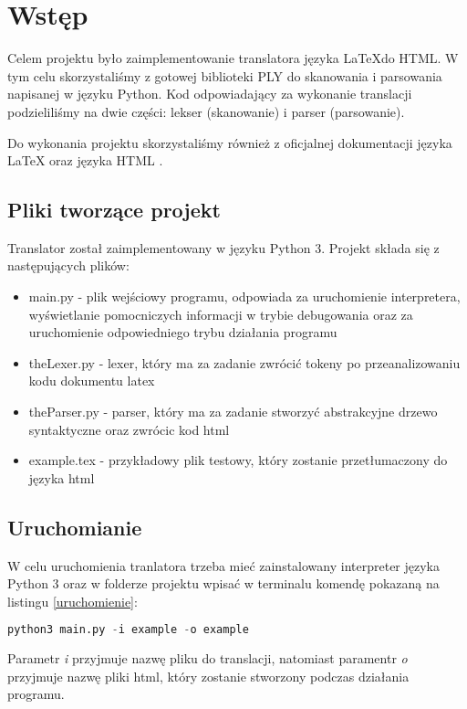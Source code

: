 \chapter{Wstęp}

Celem projektu było zaimplementowanie translatora języka \LaTeX \space do HTML. W tym celu skorzystaliśmy z gotowej
biblioteki PLY \cite{ply} do skanowania i parsowania napisanej w języku Python. Kod odpowiadający za wykonanie translacji 
podzieliliśmy na dwie części: lekser (skanowanie) i parser (parsowanie). 

Do wykonania projektu skorzystaliśmy również z oficjalnej dokumentacji języka \LaTeX \space \cite{overleaf} 
oraz języka HTML \cite{html}.

\section{Pliki tworzące projekt}
Translator został zaimplementowany w języku Python 3.
Projekt składa się z następujących plików:
\begin{itemize}
    \item main.py - plik wejściowy programu, odpowiada za uruchomienie interpretera, wyświetlanie pomocniczych informacji w trybie debugowania
        oraz za uruchomienie odpowiedniego trybu działania programu
    \item theLexer.py - lexer, który ma za zadanie zwrócić tokeny po przeanalizowaniu kodu dokumentu latex
    \item theParser.py - parser, który ma za zadanie stworzyć abstrakcyjne drzewo syntaktyczne oraz zwrócic kod html
    \item example.tex - przykładowy plik testowy, który zostanie przetłumaczony do języka html
\end{itemize}

\section{Uruchomianie}
W celu uruchomienia tranlatora trzeba mieć zainstalowany interpreter języka Python 3 oraz 
w folderze projektu wpisać w terminalu komendę pokazaną na listingu \ref{uruchomienie}:
\begin{lstlisting}[language={Python}, caption={Uruchomienie}, label={uruchomienie}]
    python3 main.py -i example -o example
\end{lstlisting}

Parametr \textit{i} przyjmuje nazwę pliku do translacji, natomiast paramentr \textit{o} przyjmuje nazwę pliki html, który
zostanie stworzony podczas działania programu.